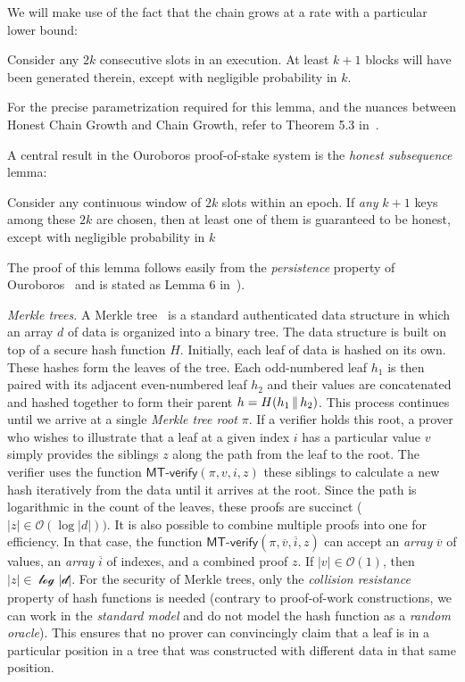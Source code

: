 We will make use of the fact that the chain grows at a rate with a
particular lower bound:

\begin{lemma}\label{lem.growth}
Consider any $2k$ consecutive slots in an execution.
At least $k+1$ blocks will have been generated therein, except with negligible
probability in $k$.
\end{lemma}

For the precise parametrization required for this lemma, and the nuances between
Honest Chain Growth and Chain Growth, refer to Theorem 5.3 in~\cite{ouroboros}.

A central result in the Ouroboros proof-of-stake system is the \emph{honest subsequence}
lemma:

\begin{lemma}\label{lem.subsequence}
Consider any continuous window of $2k$ slots within an epoch. If \emph{any}
$k+1$ keys among these $2k$ are chosen, then at least one of them is guaranteed to
be honest, except with negligible probability in $k$
\end{lemma}

The proof of this lemma follows easily from the \emph{persistence} property of
Ouroboros~\cite{ouroboros} and is stated as Lemma $6$ in~\cite{pos-sidechains}).

\noindent
\emph{Merkle trees.} A Merkle tree~\cite{merkle} is a standard authenticated data structure
in which an array $d$ of data is organized into a binary tree. The data structure is built on
top of a secure hash function $H$. Initially, each leaf of data is hashed on its own. These hashes
form the leaves of the tree. Each odd-numbered leaf $h_1$ is then paired with its adjacent even-numbered
leaf $h_2$ and their values are concatenated and hashed together to form their parent
$h = H(h_1 \,\|\, h_2)$. This process continues until we arrive at a single \emph{Merkle tree root} $\pi$.
If a verifier holds this root, a prover who wishes to illustrate that a leaf at a given index $i$
has a particular value $v$ simply provides the siblings $z$ along the path from the leaf to the root.
The verifier uses the function $\textsf{MT-verify}(\pi, v, i, z)$ these siblings to calculate a
new hash iteratively from the data until it
arrives at the root. Since the path is logarithmic in the count of the leaves, these proofs are
succinct ($|z| \in \mathcal{O}(\log |d|))$.
It is also possible to combine multiple proofs into one for efficiency. In that case,
the function $\textsf{MT-verify}(\pi, \overline{v}, \overline{i}, z)$ can accept an \emph{array} $\overline{v}$
of values, an \emph{array} $\overline{i}$ of indexes, and a combined proof $z$.
If $|v| \in \mathcal{O}(1)$, then $|z| \in \mathcal{\log|d|}$.
For the security of Merkle trees, only the \emph{collision resistance} property of hash
functions is needed (contrary to proof-of-work constructions, we can work in the \emph{standard model}
and do not model the hash function as a \emph{random oracle}). This ensures that no prover can
convincingly claim that a leaf is in a particular position in a tree that was constructed with different
data in that same position.

